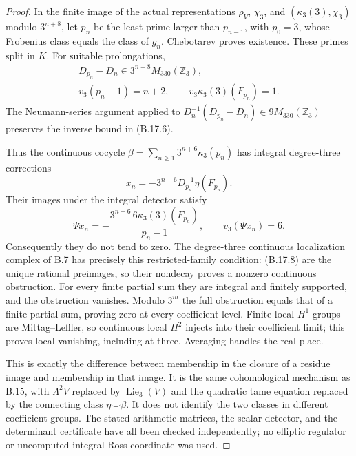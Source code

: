 \begin{proof}
In the finite image of the actual representations
$\rho_V$, $\chi_3$, and $(\kappa_3(3),\chi_3)$ modulo
$3^{n+8}$, let $p_n$ be the least prime larger than $p_{n-1}$,
with $p_0=3$, whose Frobenius class equals the class of $g_n$.
Chebotarev proves existence. These primes split in $K$.
For suitable prolongations,
\[
\begin{gathered}
 D_{p_n}-D_n\in3^{n+8}M_{330}(\mathbb Z_3),\\
 v_3(p_n-1)=n+2,\qquad v_3\kappa_3(3)(F_{p_n})=1.
\end{gathered}
\]
The Neumann-series argument applied to
$D_n^{-1}(D_{p_n}-D_n)\in9M_{330}(\mathbb Z_3)$ preserves
the inverse bound in (B.17.6).

Thus the continuous cocycle
$\beta=\sum_{n\geq1}3^{n+6}\kappa_3(p_n)$ has integral
degree-three corrections
\[
             x_n=-3^{n+6}D_{p_n}^{-1}\eta(F_{p_n}).              \tag{B.17.8}
\]
Their images under the integral detector satisfy
\[
 \Psi x_n=-\frac{3^{n+6}\,6\kappa_3(3)(F_{p_n})}{p_n-1},
                         \qquad v_3(\Psi x_n)=6.               \tag{B.17.9}
\]
Consequently they do not tend to zero. The degree-three
continuous localization complex of B.7 has precisely this
restricted-family condition: (B.17.8) are the unique rational
preimages, so their nondecay proves a nonzero continuous
obstruction. For every finite partial sum they are integral
and finitely supported, and the obstruction vanishes. Modulo
$3^m$ the full obstruction equals that of a finite partial
sum, proving zero at every coefficient level. Finite local
$H^1$ groups are Mittag--Leffler, so continuous local $H^2$
injects into their coefficient limit; this proves local
vanishing, including at three. Averaging handles the real
place.

This is exactly the difference between membership in the
closure of a residue image and membership in that image.
It is the same cohomological mechanism as B.15, with
$\Lambda^2V$ replaced by $\operatorname{Lie}_3(V)$ and the
quadratic tame equation replaced by the connecting class
$\eta\smile\beta$. It does not identify the two classes in
different coefficient groups. The stated arithmetic matrices,
the scalar detector, and the determinant certificate have
all been checked independently; no elliptic regulator or
uncomputed integral Ross coordinate was used.
\end{proof}

